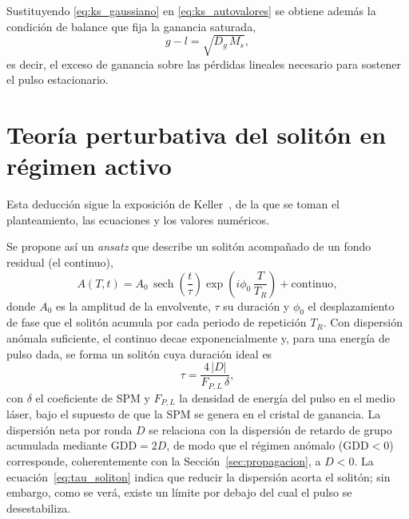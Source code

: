  Sustituyendo
\eqref{eq:ks_gaussiano} en \eqref{eq:ks_autovalores} se obtiene además la
condición de balance que fija la ganancia saturada,
%
\begin{equation}
    g - l = \sqrt{D_g\,M_s},
    \label{eq:ks_balance}
\end{equation}
%
es decir, el exceso de ganancia sobre las pérdidas lineales necesario para
sostener el pulso estacionario.

\chapter{Teoría perturbativa del solitón en régimen activo}
\label{app:soliton_activo}

Esta deducción sigue la exposición de Keller~\cite[sec.~6.6]{Keller2022}, de la que se
toman el planteamiento, las ecuaciones y los valores numéricos.

Se propone así un \emph{ansatz} que describe un solitón acompañado de un fondo
residual (el continuo),
%
\begin{equation}
    A(T,t) = A_0\,\operatorname{sech}\!\left(\frac{t}{\tau}\right)
    \exp\!\left(i\phi_0\,\frac{T}{T_R}\right) + \text{continuo},
    \label{eq:ansatz_soliton}
\end{equation}
%
donde $A_0$ es la amplitud de la envolvente, $\tau$ su duración y $\phi_0$ el
desplazamiento de fase que el solitón acumula por cada periodo de repetición
$T_R$. Con dispersión anómala suficiente, el continuo decae exponencialmente y,
para una energía de pulso dada, se forma un solitón cuya duración ideal es
%
\begin{equation}
    \tau = \frac{4\,|D|}{F_{P,L}\,\delta},
    \label{eq:tau_soliton}
\end{equation}
%
con $\delta$ el coeficiente de SPM y $F_{P,L}$ la densidad de energía del pulso en
el medio láser, bajo el supuesto de que la SPM se genera en el cristal de
ganancia. La dispersión neta por ronda $D$ se relaciona con la dispersión de
retardo de grupo acumulada mediante $\mathrm{GDD}=2D$, de modo que el régimen
anómalo ($\mathrm{GDD}<0$) corresponde, coherentemente con la
Sección~\ref{sec:propagacion}, a $D<0$. La ecuación~\eqref{eq:tau_soliton} indica
que reducir la dispersión acorta el solitón; sin embargo, como se verá, existe un
límite por debajo del cual el pulso se desestabiliza.

